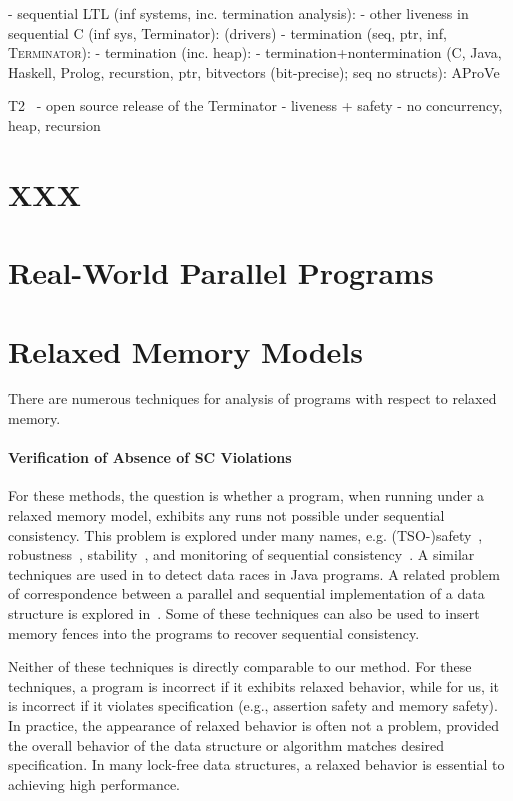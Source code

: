 - sequential LTL (inf systems, inc. termination analysis): \cite{Dietsch2015}
- other liveness in sequential C (inf sys, Terminator): \cite{Cook2007} (drivers)
- termination (seq, ptr, inf, \textsc{Terminator}): \cite{Cook2006}
- termination (inc. heap): \cite{Berdine2006}
- termination+nontermination (C, Java, Haskell, Prolog, recurstion, ptr, bitvectors (bit-precise); seq no structs): AProVe \cite{Hensel2017, Giesl2017}

T2~\cite{Brockschmidt2016}
- open source release of the Terminator
- liveness + safety
- no concurrency, heap, recursion

\section{XXX}

\section{Real-World Parallel Programs}


\section{Relaxed Memory Models}

There are numerous techniques for analysis of programs with respect to relaxed memory.

\paragraph{Verification of Absence of SC Violations}

For these methods, the question is whether a program, when running under a relaxed memory model, exhibits any runs not possible under sequential consistency.
This problem is explored under many names, e.g. (TSO-)safety~\cite{Burckhardt2008}, robustness~\cite{Bouajjani2013,Derevenetc2014}, stability~\cite{Alglave2011}, and monitoring of sequential consistency~\cite{Burnim2011}.
A similar techniques are used in \cite{Yang2004} to detect data races in Java programs.
A related problem of correspondence between a parallel and sequential implementation of a data structure is explored in~\cite{Ou2017}.
Some of these techniques can also be used to insert memory fences into the programs to recover sequential consistency.

Neither of these techniques is directly comparable to our method.
For these techniques, a program is incorrect if it exhibits relaxed behavior, while for us, it is incorrect if it violates specification (e.g., assertion safety and memory safety).
In practice, the appearance of relaxed behavior is often not a problem, provided the overall behavior of the data structure or algorithm matches desired specification.
In many lock-free data structures, a relaxed behavior is essential to achieving high performance.

